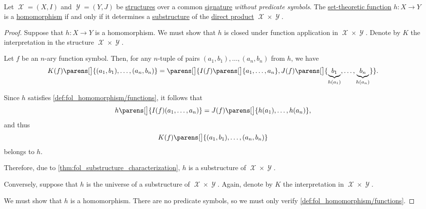 \begin{proposition}\label{thm:fol_homomorphism_as_substructure}
  Let \( \mscrX = (X, I) \) and \( \mscrY = (Y, J) \) be \hyperref[def:fol_structure]{structures} over a common \hyperref[def:fol_signature]{signature} \emph{without predicate symbols}. The \hyperref[def:function]{set-theoretic function} \( h: X \to Y \) is a \hyperref[def:fol_homomorphism]{homomorphism} if and only if it determines a \hyperref[def:fol_substructure]{substructure} of the \hyperref[def:fol_direct_product]{direct product} \( \mscrX \times \mscrY \).
\end{proposition}
\begin{proof}
  \SufficiencySubProof Suppose that \( h: X \to Y \) is a homomorphism. We must show that \( h \) is closed under function application in \( \mscrX \times \mscrY \). Denote by \( K \) the interpretation in the structure \( \mscrX \times \mscrY \).

  Let \( f \) be an \( n \)-ary function symbol. Then, for any \( n \)-tuple of pairs \( (a_1, b_1), \ldots, (a_n, b_n) \) from \( h \), we have
  \begin{equation*}
    K(f)\parens[\big]{ (a_1, b_1), \ldots, (a_n, b_n) }
    =
    \parens[\big]{ I(f)\parens[\big]{ a_1, \ldots, a_n }, J(f)\parens[\big]{ \underbrace{b_1}_{h(a_1)}, \ldots, \underbrace{b_n}_{h(a_n)} } }.
  \end{equation*}

  Since \( h \) satisfies \cref{def:fol_homomorphism/functions}, it follows that
  \begin{equation*}
    h\parens[\big]{ I(f)(a_1, \ldots, a_n) } = J(f)\parens[\big]{ h(a_1), \ldots, h(a_n) },
  \end{equation*}
  and thus
  \begin{equation*}
    K(f)\parens[\big]{ (a_1, b_1), \ldots, (a_n, b_n) }
  \end{equation*}
  belongs to \( h \).

  Therefore, due to \cref{thm:fol_substructure_characterization}, \( h \) is a substructure of \( \mscrX \times \mscrY \).

  \NecessitySubProof Conversely, suppose that \( h \) is the universe of a substructure of \( \mscrX \times \mscrY \). Again, denote by \( K \) the interpretation in \( \mscrX \times \mscrY \).

  We must show that \( h \) is a homomorphism. There are no predicate symbols, so we must only verify \cref{def:fol_homomorphism/functions}.


\end{proof}
